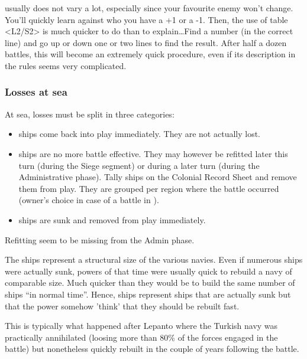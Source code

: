 \begin{designnote}
   usually does not vary a lot, especially since your
  favourite enemy won't change. You'll quickly learn against who you have a +1
  or a -1. Then, the use of table <L2/S2> is much quicker to do than to
  explain\ldots Find a number (in the correct line) and go up or down one or
  two lines to find the result. After half a dozen battles, this will become
  an extremely quick procedure, even if its description in the rules seems
  very complicated.
\end{designnote}

\subsubsection{Losses at sea}
At sea, losses must be split in three categories:
\begin{itemize}
\item {} ships come back into play immediately. They are not
  actually lost.
\item {} ships are no more battle effective. They may however be
  refitted later this turn (during the Siege segment) or during a later turn
  (during the Administrative phase). Tally  ships on the
  Colonial Record Sheet and remove them from play. They are grouped per region
  where the battle occurred (owner's choice in case of a battle in
  \seazoneHorn).
\item {} ships are sunk and removed from play immediately.
\end{itemize}

\begin{todo}
  Refitting seem to be missing from the Admin phase.
\end{todo}

\begin{designnote}
  The  ships represent a structural size of the various
  navies. Even if numerous ships were actually sunk, powers of that time were
  usually quick to rebuild a navy of comparable size. Much quicker than they
  would be to build the same number of ships ``in normal time''. Hence,
   ships represent ships that are actually sunk but that the
  power somehow 'think' that they should be rebuilt fast.

  This is typically what happened after Lepanto where the Turkish navy was
  practically annihilated (loosing more than 80\% of the forces engaged in the
  battle) but nonetheless quickly rebuilt in the couple of years following the
  battle.
\end{designnote}

